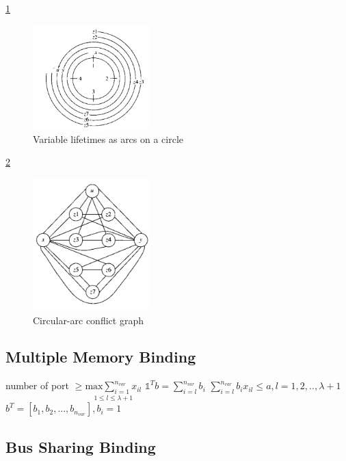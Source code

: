 \ref{fig:Variable_lifetimes_as_arcs_on_a_circle}
\begin{figure}[h]
    \centering
    \includegraphics[width=0.4\textwidth]{Variable_lifetimes_as_arcs_on_a_circle}
    \caption{ Variable lifetimes as arcs on a circle \cite{b1}}
    \label{fig:Variable_lifetimes_as_arcs_on_a_circle}
\end{figure}

\ref{fig:Circular_arc_confliCr_graph}
\begin{figure}[h]
    \centering
    \includegraphics[width=0.4\textwidth]{Circular_arc_confliCr_graph}
    \caption{ Circular-arc conflict graph \cite{b1}}
    \label{fig:Circular_arc_confliCr_graph}
\end{figure}

\subsection{Multiple Memory Binding}

number of port $\geq \underset{1\leq l \leq \lambda + 1}{\mathrm{max} \sum_{i=1}^{n_{var}} x_{il}} $
$ \mathds{1}^{T} b = \sum_{i=l}^{n_{var}}b_{i}$
$ \sum_{i=l}^{n_{var}}b_{i}x_{il}\leq a,l=1,2,..,\lambda+1 $
$ b^{T}=[b_{1},b_{2},...,b_{n_{var}}],b_{i}=1 $
\subsection{Bus Sharing Binding}

